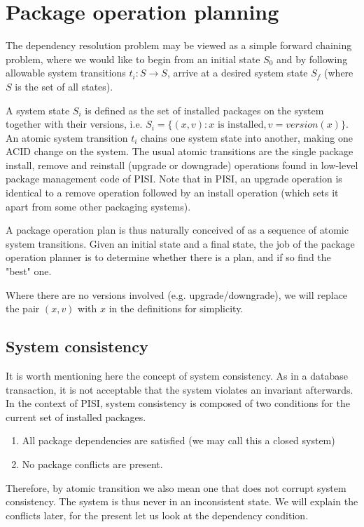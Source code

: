 \documentclass[a4paper,11pt]{article}
\begin{document}
\section{Package operation planning}

The dependency resolution problem may be viewed as a simple forward
chaining problem, where we would like to begin from an initial state
$S_0$ and by following allowable system transitions $t_i: S \to S$, 
arrive at a desired system state $S_f$ (where $S$ is the set of all states).

A system state $S_i$ is defined as the set of installed packages on
the system together with their versions, i.e. $S_i = \{ (x,v) : x
\text{ is installed}, v=version(x)\} $. An atomic system transition
$t_i$ chains one system state into another, making one ACID change on
the system. The usual atomic transitions are the single package
install, remove and reinstall (upgrade or downgrade) operations found
in low-level package management code of PISI. Note that in PISI, an
upgrade operation is identical to a remove operation followed by an
install operation (which sets it apart from some other packaging
systems).

A package operation plan is thus naturally conceived of as a sequence
of atomic system transitions. Given an initial state and a final
state, the job of the package operation planner is to determine
whether there is a plan, and if so find the "best" one.

Where there are no versions involved (e.g. upgrade/downgrade), we will
replace the pair $(x,v)$ with $x$ in the definitions for simplicity.

\subsection{System consistency}

It is worth mentioning here the concept of system consistency. As in a
database transaction, it is not acceptable that the system violates an
invariant afterwards. In the context of PISI, system consistency is
composed of two conditions for the current set of installed packages.
\begin{enumerate}
\item All package dependencies are satisfied (we may call this a
  closed system)
\item No package conflicts are present. 
\end{enumerate}

Therefore, by atomic transition we also mean one that does not corrupt
system consistency. The system is thus never in an inconsistent
state. We will explain the conflicts later, for the present let us
look at the dependency condition.
\end{document}
